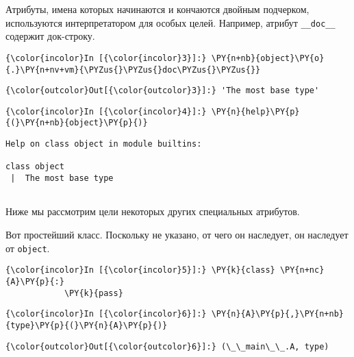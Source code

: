     Атрибуты, имена которых начинаются и кончаются двойным подчерком,
используются интерпретатором для особых целей. Например, атрибут
\texttt{\_\_doc\_\_} содержит док-строку.

    \begin{Verbatim}[commandchars=\\\{\}]
{\color{incolor}In [{\color{incolor}3}]:} \PY{n+nb}{object}\PY{o}{.}\PY{n+nv+vm}{\PYZus{}\PYZus{}doc\PYZus{}\PYZus{}}
\end{Verbatim}

            \begin{Verbatim}[commandchars=\\\{\}]
{\color{outcolor}Out[{\color{outcolor}3}]:} 'The most base type'
\end{Verbatim}
        
    \begin{Verbatim}[commandchars=\\\{\}]
{\color{incolor}In [{\color{incolor}4}]:} \PY{n}{help}\PY{p}{(}\PY{n+nb}{object}\PY{p}{)}
\end{Verbatim}

    \begin{Verbatim}[commandchars=\\\{\}]
Help on class object in module builtins:

class object
 |  The most base type


    \end{Verbatim}

    Ниже мы рассмотрим цели некоторых других специальных атрибутов.

Вот простейший класс. Поскольку не указано, от чего он наследует, он
наследует от \texttt{object}.

    \begin{Verbatim}[commandchars=\\\{\}]
{\color{incolor}In [{\color{incolor}5}]:} \PY{k}{class} \PY{n+nc}{A}\PY{p}{:}
            \PY{k}{pass}
\end{Verbatim}

    \begin{Verbatim}[commandchars=\\\{\}]
{\color{incolor}In [{\color{incolor}6}]:} \PY{n}{A}\PY{p}{,}\PY{n+nb}{type}\PY{p}{(}\PY{n}{A}\PY{p}{)}
\end{Verbatim}

            \begin{Verbatim}[commandchars=\\\{\}]
{\color{outcolor}Out[{\color{outcolor}6}]:} (\_\_main\_\_.A, type)
\end{Verbatim}
        

